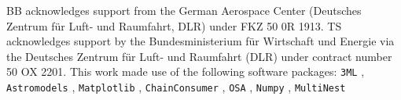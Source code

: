 \documentclass[twocolumn,traditabstract]{aa}
\begin{document}
\begin{acknowledgement}
BB acknowledges support from the German Aerospace Center (Deutsches Zentrum f\"ur Luft- und Raumfahrt, DLR) under FKZ 50 0R 1913. TS acknowledges support by the Bundesministerium f\"ur Wirtschaft und Energie via the Deutsches Zentrum f\"ur Luft- und Raumfahrt (DLR) under contract number 50 OX 2201.
This work made use of the following software packages:
{\tt 3ML} \citep{3ML}, {\tt Astromodels} \citep{astromodels}, {\tt Matplotlib} \citep{matplotlib}, {\tt ChainConsumer} \citep{chainconsumer, chainconsumer2}, {\tt OSA} \citep{osa}, {\tt Numpy} \citep{numpy}, {\tt MultiNest} \citep{multinest, multinest1, multinest3}
\end{acknowledgement}



\end{document}

